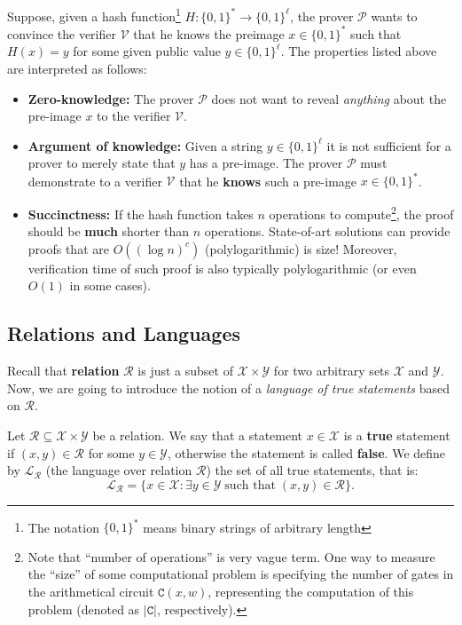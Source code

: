 \documentclass[../lecture-notes.tex]{subfiles}
\begin{document}
\begin{example}
    Suppose, given a hash function\footnote{The notation $\{0,1\}^*$ means binary strings of arbitrary length} $H: \{0,1\}^* \to \{0,1\}^{\ell}$, the prover $\mathcal{P}$ wants to convince the verifier $\mathcal{V}$ that he knows the preimage $x \in \{0,1\}^*$ such that $H(x) = y$ for some given public value $y \in \{0,1\}^{\ell}$. The properties listed above are interpreted as follows:
    \begin{itemize}
        \item \textbf{Zero-knowledge:} The prover $\mathcal{P}$ does not want to reveal \textit{anything} about the pre-image $x$ to the verifier $\mathcal{V}$.
        \item \textbf{Argument of knowledge:} Given a string $y \in \{0,1\}^{\ell}$ it is not sufficient for a prover to merely state that $y$ has a pre-image. The prover $\mathcal{P}$ must demonstrate to a verifier $\mathcal{V}$ that he \textbf{knows} such a pre-image $x \in \{0,1\}^*$.
        \item \textbf{Succinctness:} If the hash function takes $n$ operations to compute\footnote{Note that ``number of operations'' is very vague term. One way to measure the ``size'' of some computational problem is specifying the number of gates in the arithmetical circuit $\mathtt{C}(x,w)$, representing the computation of this problem (denoted as $|\mathtt{C}|$, respectively).}, the proof should be \textbf{much} shorter than $n$ operations. State-of-art solutions can provide proofs that are $O((\log n)^c)$ (polylogarithmic) is size! Moreover, verification time of such proof is also typically polylogarithmic (or even $O(1)$ in some cases).
    \end{itemize}
\end{example}

\subsection{Relations and Languages}\label{section:relations_and_languages}
Recall that \textbf{relation} $\mathcal{R}$ is just a subset of $\mathcal{X} \times \mathcal{Y}$ for two arbitrary sets $\mathcal{X}$ and $\mathcal{Y}$. Now, we are going to introduce the notion of a \emph{language of true statements} based on $\mathcal{R}$.

\begin{definition}
    Let $\mathcal{R} \subseteq \mathcal{X} \times \mathcal{Y}$ be a relation. We say that a statement $x \in \mathcal{X}$ is a \textbf{true} statement if $(x,y) \in \mathcal{R}$ for some $y \in \mathcal{Y}$, otherwise the statement is called \textbf{false}. We define by $\mathcal{L}_{\mathcal{R}}$ (the language over relation $\mathcal{R}$) the set of all true statements, that is:
    \begin{equation*}
        \mathcal{L}_{\mathcal{R}} = \{ x \in \mathcal{X}: \exists y \in \mathcal{Y} \; \text{such that} \; (x,y) \in \mathcal{R} \}.
    \end{equation*}
\end{definition}
\end{document}
